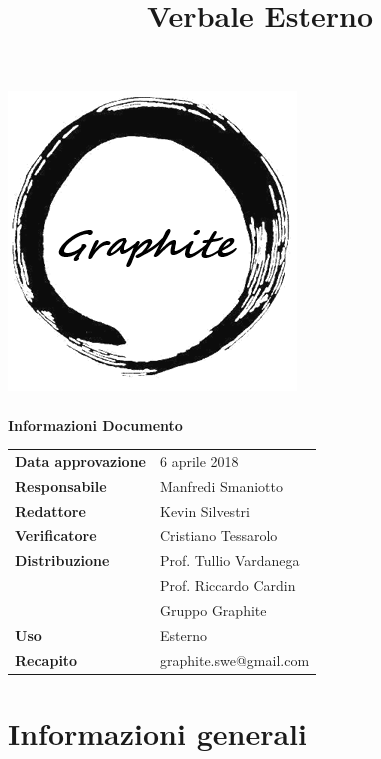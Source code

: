 \documentclass[openany,12pt,a4paper]{article}
\title{Verbale Esterno}
\author{}
\begin{document}
 
  \makeatletter 
  \begin{titlepage} 
    \setlength{\headsep}{0pt}   
    \begin{center} 
      \includegraphics[width=0.5\linewidth]{Logo.png}\\[1em] 
      {\huge \bfseries  \@title }\\[10ex] 
      \textbf{\Large Informazioni Documento} \\[2em] 
      \bgroup 
      \def\arraystretch{1.5} 
      \begin{tabular}{l|l} 
        \textbf{Data approvazione} & 6 aprile 2018 \\ 
        \textbf{Responsabile} & Manfredi Smaniotto \\ 
        \textbf{Redattore} & Kevin Silvestri \\ 
        \textbf{Verificatore} & Cristiano Tessarolo \\ 
        \textbf{Distribuzione} & Prof. Tullio Vardanega \\ 
         & Prof. Riccardo Cardin \\ 
         & Gruppo Graphite \\ 
        \textbf{Uso} & Esterno \\ 
        \textbf{Recapito} & graphite.swe@gmail.com \\ 
      \end{tabular} 
    \egroup 
    \end{center} 
  \end{titlepage} 
  \makeatother 
 
  \thispagestyle{empty} 
  \newpage 
   
  \tableofcontents 
  \newpage 
   
  \section{Informazioni generali} 
   
\end{document}
